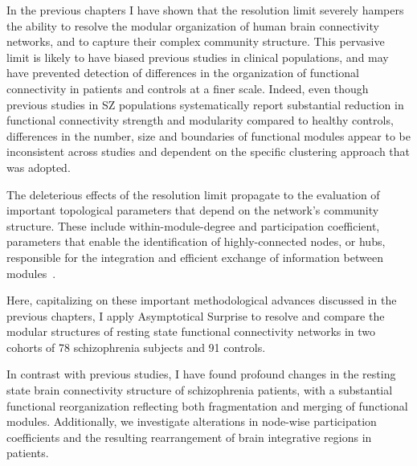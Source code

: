 In the previous chapters I have shown that the resolution limit severely hampers the ability to resolve the modular organization of human brain connectivity networks, and to capture their complex community structure.
This pervasive limit is likely to have biased previous studies in clinical populations, and may have prevented detection of differences in the organization of functional connectivity in patients and controls at a finer scale.
Indeed, even though previous studies in SZ populations systematically report substantial reduction in functional connectivity strength and modularity compared to healthy controls, differences in the number, size and boundaries of functional modules appear to be inconsistent across studies and dependent on the specific clustering approach that was adopted.

The deleterious effects of the resolution limit propagate to the evaluation of important topological parameters that depend on the network's community structure.
These include within-module-degree and participation coefficient, parameters that enable the identification of highly-connected nodes, or hubs, responsible for the integration and efficient exchange of information between modules~\cite{bullmore2009}.

Here, capitalizing on these important methodological advances discussed in the previous chapters, I apply Asymptotical Surprise to resolve and compare the modular structures of resting state functional connectivity networks in two cohorts of 78 schizophrenia subjects and 91 controls.

In contrast with previous studies, I have found profound changes in the resting state brain connectivity structure of schizophrenia patients, with a substantial functional reorganization reflecting both fragmentation and merging of functional modules.
Additionally, we investigate alterations in node-wise participation coefficients and the resulting rearrangement of brain integrative regions in patients.


